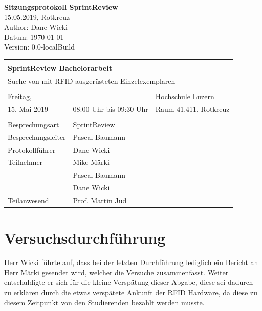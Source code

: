 \documentclass[parskip=full, a4paper]{scrreprt}
\providecommand{\docversion}{0.0-localBuild}
\begin{document}
\begin{titlepage}
\vspace*{2.5cm}
\noindent
\Huge{\textbf{Sitzungsprotokoll SprintReview}} \\
\noindent
\Large{15.05.2019, Rotkreuz}\\
\vfill
\noindent
\large{Author: Dane Wicki}\\
\noindent
\large{Datum: \today}\\
\noindent
\large{Version: \docversion}\\
\end{titlepage}

\noindent
\begin{tabularx}{\textwidth}{XXl}
\hline \\
\multicolumn{3}{l}{\Large{\textbf{SprintReview  Bachelorarbeit}}}\\
\multicolumn{3}{l}{Suche von mit RFID ausgerüsteten Einzelexemplaren} \\ \\
\hline
	Freitag, & & Hochschule Luzern \\
	15. Mai 2019 & 08:00 Uhr bis 09:30 Uhr & Raum 41.411, Rotkreuz \\
\hline \\
\hline
Besprechungsart & SprintReview & \\
\hline
Besprechungsleiter & Pascal Baumann & \\
\hline
Protokollführer & Dane Wicki & \\
\hline
Teilnehmer & Mike Märki & \\ & Pascal Baumann & \\ & Dane Wicki & \\
\hline
Teilanwesend & Prof. Martin Jud & \\
\hline
\end{tabularx}

	\noindent

\tableofcontents
\clearpage
\chapter{Versuchsdurchführung}
Herr Wicki führte auf, dass bei der letzten Durchführung lediglich ein Bericht an Herr Märki gesendet wird, welcher die Versuche zusammenfasst.
Weiter entschuldigte er sich für die kleine Verspätung dieser Abgabe, diese sei dadurch zu erklären durch die etwas verspätete Ankunft der RFID Hardware, da diese zu diesem Zeitpunkt von den Studierenden bezahlt werden musste.
\end{document}
